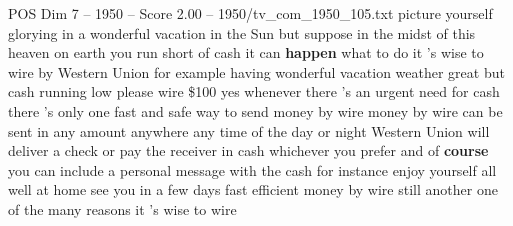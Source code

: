\begin{textsample}{POS Dim 7 – 1950 – Score 2.00 – 1950/tv\_com\_1950\_105.txt}  \label{ex:f7_pos_020}
picture yourself glorying in a wonderful vacation in the Sun but suppose in the midst of this heaven on earth you run short of cash it can \textbf{happen} what to do it 's wise to wire by Western Union for example having wonderful vacation weather great but cash running low please wire \$100 yes whenever there 's an urgent need for cash there 's only one fast and safe way to send money by wire money by wire can be sent in any amount anywhere any time of the day or night Western Union will deliver a check or pay the receiver in cash whichever you prefer and of \textbf{course} you can include a personal message with the cash for instance enjoy yourself all well at home see you in a few days fast efficient money by wire still another one of the many reasons it 's wise to wire

\end{textsample}
